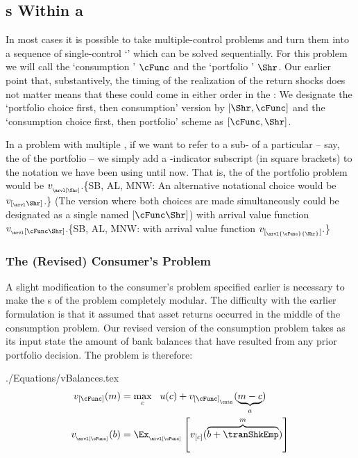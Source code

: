 \documentclass[SolvingMicroDSOPs]{subfiles}
\begin{document}
\hypertarget{stages-within-a-period}{}
\subsection{{\Stg}s Within a {\Interval}}\label{subsec:stageswithin}

In most cases it is possible to take multiple-control problems and turn them into a sequence of single-control `{\stgs}' which can be solved sequentially.  For this problem we will call the `consumption {\stg}' $\cFunc$ and the `portfolio {\stg}' $\Shr$.  Our earlier point that, substantively, the timing of the realization of the return shocks does not matter means that these could come in either order in the {\interval}: We designate the `portfolio choice first, then consumption' version by $[\Shr,\cFunc]$ and the `consumption choice first, then portfolio' scheme as $[\cFunc,\Shr]$. 

In a problem with multiple {\stgs}, if we want to refer to a sub-{\move} of a particular {\stg} -- say, the {\Arrival} {\move} of the portfolio {\stg} -- we simply add a {\stg}-indicator subscript (in square brackets) to the notation we have been using until now.  That is, the {\Arrival} {\stg} of the portfolio problem would be $\vFunc_{_\arvl[\Shr]}$.\{SB, AL, MNW: An alternative notational choice would be $\vFunc_{[_\arvl\Shr]}$.\}  (The version where both choices are made simultaneously could be designated as a single {\stg} named $[{\cFunc}{\Shr}]$) with arrival value function $\vFunc_{_\arvl[{\cFunc}{\Shr}]}$.\{SB, AL, MNW: with arrival value function $\vFunc_{[_\arvl{\cFunc}{\Shr}]}.$\}

\hypertarget{revised-consumers-problem}{}
\subsubsection{The (Revised) Consumer's Problem}\label{subsubsec:revised-consumers-problem}

A slight modification to the consumer's problem specified earlier is necessary to make the {\stg}s of the problem completely modular.  The difficulty with the earlier formulation is that it assumed that asset returns occurred in the middle {\move} of the consumption problem.  Our revised version of the consumption problem takes as its input state the amount of bank balances that have resulted from any prior portfolio decision.  The problem is therefore:
\begin{verbatimwrite}{./Equations/vBalances.tex}
  \begin{equation}\begin{gathered}\begin{aligned}
 \vFunc_{[\cFunc]}(\mNrm) & =  \max_{\cNrm} ~~ \uFunc(\cNrm)+  \vFunc_{[\cFunc]_{_\cntn}}(\underbrace{\mNrm-\cNrm}_{\aNrm})             
\\    \vFunc_{_\arvl[\cFunc]}(\bNrm) & = \Ex_{_\arvl[\cFunc]}\left[\vFunc_{[\cNrm]}(\overbrace{\bNrm+\tranShkEmp}^{m})\right] \label{eq:vBalances}
      \end{aligned}\end{gathered}\end{equation}
\end{verbatimwrite}
\unskip
\end{document}
